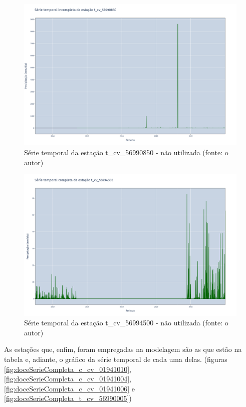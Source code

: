 \begin{figure}[!h]
\centering
\includegraphics[scale=0.25]{Figuras/rio_doce/doceSerieIncompleta_t_cv_56990850.png}
\caption{Série temporal da estação t\_cv\_56990850 - não utilizada (fonte: o autor)}
\label{fig:doceSerieIncompleta_t_cv_56990850}
\end{figure}

\begin{figure}[!h]
\centering
\includegraphics[scale=0.25]{Figuras/rio_doce/doceSerieCompleta_t_cv_56994500.png}
\caption{Série temporal da estação t\_cv\_56994500 - não utilizada (fonte: o autor)}
\label{fig:doceSerieCompleta_t_cv_56994500}
\end{figure}

As estações que, enfim, foram empregadas na modelagem são as que estão na tabela e, adiante, o gráfico da série temporal de cada uma delas. (figuras \ref{fig:doceSerieCompleta_c_cv_01941010}, \ref{fig:doceSerieCompleta_c_cv_01941004}, \ref{fig:doceSerieCompleta_c_cv_01941006} e \ref{fig:doceSerieCompleta_t_cv_56990005})

